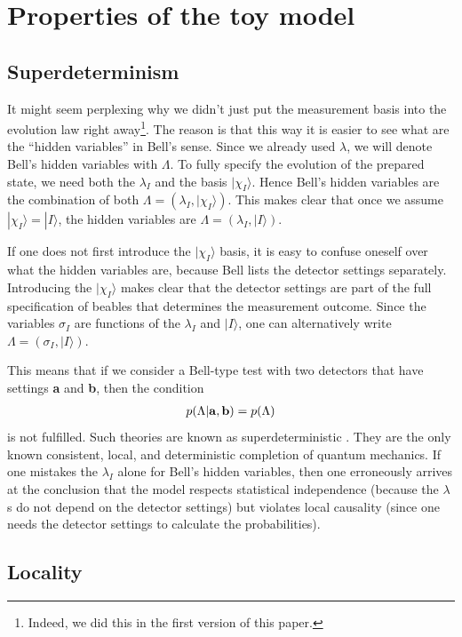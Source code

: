 \documentclass[11pt,twoside,A4]{article}
\def\beqn{\begin{eqnarray}}
\def\eeqn{\end{eqnarray}}
\begin{document}
\section{Properties of the toy model}

\subsection{Superdeterminism}

It might seem perplexing why we didn't just put the measurement basis into the evolution law right away\footnote{Indeed, we did this in the first version of this paper.}. The reason is that this way it is easier to see what are the ``hidden variables'' in Bell's sense. Since we already used $\lambda$, we will denote Bell's hidden variables with $\Lambda$. To fully specify the evolution of the prepared state, we need both the $\lambda_I$ and the basis $|\chi_I\rangle$. 
Hence Bell's hidden variables are the combination of both $\Lambda = (\lambda_I, | \chi_I \rangle)$. This makes clear that once we assume $|\chi_I\rangle = |I\rangle$, the hidden variables are $\Lambda = (\lambda_I, | I \rangle)$. 


If one does not first introduce the $|\chi_I \rangle$ basis, it is easy to confuse oneself over what the hidden variables are, because Bell lists the detector settings separately. Introducing the $|\chi_I \rangle$ makes clear that the detector settings are part of the full specification of beables that  determines the measurement outcome.  Since 
the variables $\sigma_I$ are functions of the $\lambda_I$ and $|I\rangle$, one can alternatively write $\Lambda = (\sigma_I, |I \rangle)$.

This means that if we consider a Bell-type test with two detectors that have settings {\bf a} and {\bf b}, then the condition
\beqn
p(\Lambda | \mathrm{\bf a}, \mathrm{\bf b}) = p(\Lambda) 
\eeqn
is not fulfilled. Such theories are known as superdeterministic \cite{Hossenfelder:2019shy}. They are the only known consistent, local, and deterministic completion of quantum mechanics. If one mistakes the $\lambda_I$ alone for Bell's hidden variables, then one erroneously arrives at the conclusion that the model respects statistical independence (because the $\lambda$s do not depend on the detector settings) but violates local causality (since one needs the detector settings to calculate the probabilities).

\subsection{Locality}
\end{document}
